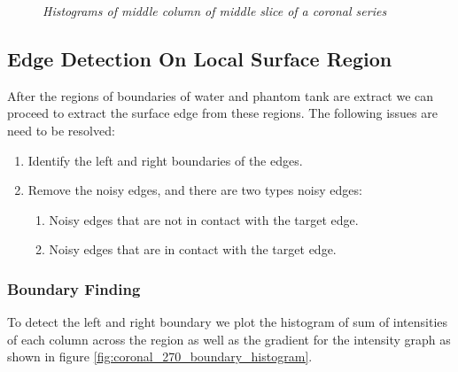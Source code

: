 \begin{figure}[htb]
  \caption{\emph{Histograms of middle column of middle slice of a coronal series}} 
  \label{fig:histograms_mid_coronal}
\end{figure}

\subsection{Edge Detection On Local Surface Region}

After the regions of boundaries of water and phantom tank are extract we can proceed to extract the surface
edge from these regions. The following issues are need to be resolved:
\begin{enumerate}
  \item Identify the left and right boundaries of the edges.
  \item Remove the noisy edges, and there are two types noisy edges:
    \begin{enumerate}
      \item Noisy edges that are not in contact with the target edge.
      \item Noisy edges that are in contact with the target edge.
    \end{enumerate}
\end{enumerate}

\subsubsection{Boundary Finding}

To detect the left and right boundary we plot the histogram of sum of intensities of each column across the
region as well as the gradient for the intensity graph as shown in figure 
\ref{fig:coronal_270_boundary_histogram}. 

